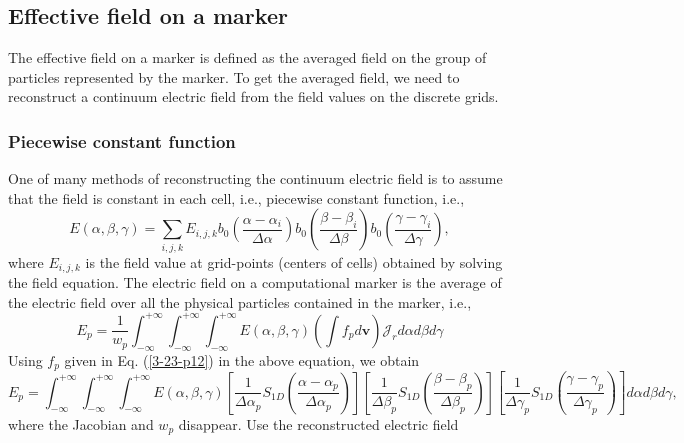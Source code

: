 \documentclass{article}
\begin{document}
\subsection{Effective field on a marker}

The effective field on a marker is defined as the averaged field on the group
of particles represented by the marker. To get the averaged field, we need to
reconstruct a continuum electric field from the field values on the discrete
grids.

\subsubsection{Piecewise constant function}

One of many methods of reconstructing the continuum electric field is to
assume that the field is constant in each cell, i.e., piecewise constant
function, i.e.,
\begin{equation}
  \label{2-23-p20} E (\alpha, \beta, \gamma) = \sum_{i, j, k} E_{i, j, k} b_0
  \left( \frac{\alpha - \alpha_i}{\Delta \alpha} \right) b_0 \left(
  \frac{\beta - \beta_i}{\Delta \beta} \right) b_0 \left( \frac{\gamma -
  \gamma_i}{\Delta \gamma} \right),
\end{equation}
where $E_{i, j, k}$ is the field value at grid-points (centers of cells)
obtained by solving the field equation. The electric field on a computational
marker is the average of the electric field over all the physical particles
contained in the marker, i.e.,
\begin{equation}
  E_p = \frac{1}{w_p} \int_{- \infty}^{+ \infty} \int_{- \infty}^{+ \infty}
  \int_{- \infty}^{+ \infty} E (\alpha, \beta, \gamma) \left( \int f_p
  d\mathbf{v} \right) \mathcal{J}_r d \alpha d \beta d \gamma
\end{equation}
Using $f_p$ given in Eq. (\ref{3-23-p12}) in the above equation, we obtain
\begin{equation}
  E_p = \int_{- \infty}^{+ \infty} \int_{- \infty}^{+ \infty} \int_{-
  \infty}^{+ \infty} E (\alpha, \beta, \gamma) \left[ \frac{1}{\Delta
  \alpha_p} S_{1 D} \left( \frac{\alpha - \alpha_p}{\Delta \alpha_p} \right)
  \right] \left[ \frac{1}{\Delta \beta_p} S_{1 D} \left( \frac{\beta -
  \beta_p}{\Delta \beta_p} \right) \right] \left[ \frac{1}{\Delta \gamma_p}
  S_{1 D} \left( \frac{\gamma - \gamma_p}{\Delta \gamma_p} \right) \right] d
  \alpha d \beta d \gamma,
\end{equation}
where the Jacobian and $w_p$ disappear. Use the reconstructed electric field
\end{document}
